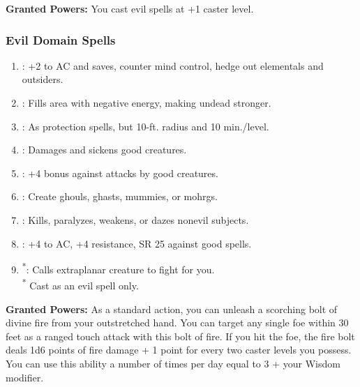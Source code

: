 \textbf{Granted Powers:} You cast evil spells at +1 caster level.
\subsubsection{Evil Domain Spells}
\begin{enumerate}
	\item{:} +2 to AC and saves, counter mind control, hedge out elementals and outsiders.
	\item{:} Fills area with negative energy, making undead stronger.
	\item{:} As protection spells, but 10-ft. radius and 10 min./level.
	\item{:} Damages and sickens good creatures.
	\item{:} +4 bonus against attacks by good creatures.
	\item{:} Create ghouls, ghasts, mummies, or mohrgs.
	\item{:} Kills, paralyzes, weakens, or dazes nonevil subjects.
	\item{:} +4 to AC, +4 resistance, SR 25 against good spells.
	\item{\textsuperscript{*}:} Calls extraplanar creature to fight for you.
	\\ \textsuperscript{*} Cast as an evil spell only.
\end{enumerate}

\textbf{Granted Powers:} As a standard action, you can unleash a scorching bolt of divine fire from your outstretched hand. You can target any single foe within 30 feet as a ranged touch attack with this bolt of fire. If you hit the foe, the fire bolt deals 1d6 points of fire damage + 1 point for every two caster levels you possess. You can use this ability a number of times per day equal to 3 + your Wisdom modifier.
